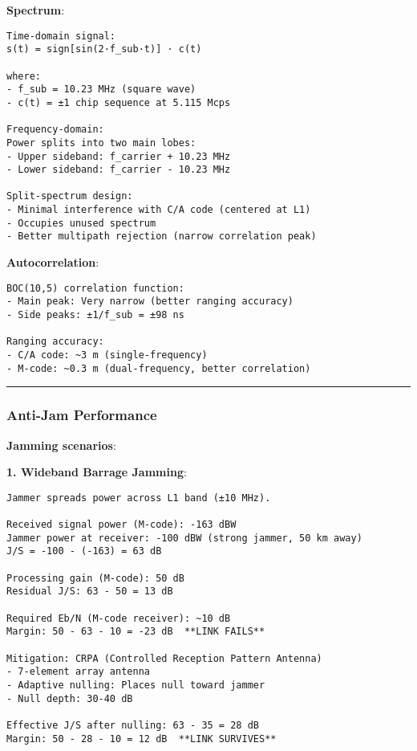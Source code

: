 \textbf{Spectrum}:

\begin{verbatim}
Time-domain signal:
s(t) = sign[sin(2·f_sub·t)] · c(t)

where:
- f_sub = 10.23 MHz (square wave)
- c(t) = ±1 chip sequence at 5.115 Mcps

Frequency-domain:
Power splits into two main lobes:
- Upper sideband: f_carrier + 10.23 MHz
- Lower sideband: f_carrier - 10.23 MHz

Split-spectrum design:
- Minimal interference with C/A code (centered at L1)
- Occupies unused spectrum
- Better multipath rejection (narrow correlation peak)
\end{verbatim}

\textbf{Autocorrelation}:

\begin{verbatim}
BOC(10,5) correlation function:
- Main peak: Very narrow (better ranging accuracy)
- Side peaks: ±1/f_sub = ±98 ns

Ranging accuracy:
- C/A code: ~3 m (single-frequency)
- M-code: ~0.3 m (dual-frequency, better correlation)
\end{verbatim}

\begin{center}\rule{0.5\linewidth}{0.5pt}\end{center}

\subsubsection{Anti-Jam Performance}\label{anti-jam-performance}

\textbf{Jamming scenarios}:

\textbf{1. Wideband Barrage Jamming}:

\begin{verbatim}
Jammer spreads power across L1 band (±10 MHz).

Received signal power (M-code): -163 dBW
Jammer power at receiver: -100 dBW (strong jammer, 50 km away)
J/S = -100 - (-163) = 63 dB

Processing gain (M-code): 50 dB
Residual J/S: 63 - 50 = 13 dB

Required Eb/N (M-code receiver): ~10 dB
Margin: 50 - 63 - 10 = -23 dB  **LINK FAILS**

Mitigation: CRPA (Controlled Reception Pattern Antenna)
- 7-element array antenna
- Adaptive nulling: Places null toward jammer
- Null depth: 30-40 dB

Effective J/S after nulling: 63 - 35 = 28 dB
Margin: 50 - 28 - 10 = 12 dB  **LINK SURVIVES**
\end{verbatim}

